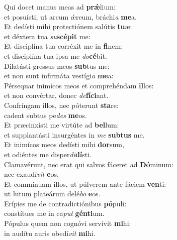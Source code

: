\oddverse Qui docet manus meas ad \textbf{prǽ}lium:~\*\\
\oddverse et posuísti, ut arcum ǽreum, bráchi\textit{a} \textbf{me}a.\\
\evenverse Et dedísti mihi protectiónem salútis \textbf{tu}æ:~\*\\
\evenverse et déxtera tua \textit{su}\textbf{scé}\textbf{pit} me:\\
\oddverse Et disciplína tua corréxit me in \textbf{fi}nem:~\*\\
\oddverse et disciplína tua ipsa me \textit{do}\textbf{cé}bit.\\
\evenverse Dilatásti gressus meos \textbf{sub}tus me:~\*\\
\evenverse et non sunt infirmáta vestígi\textit{a} \textbf{me}a:\\
\oddverse Pérsequar inimícos meos et comprehéndam \textbf{il}los:~\*\\
\oddverse et non convértar, donec \textit{de}\textbf{fí}\textbf{ci}ant.\\
\evenverse Confríngam illos, nec póterunt \textbf{sta}re:~\*\\
\evenverse cadent subtus pe\textit{des} \textbf{me}os.\\
\oddverse Et præcinxísti me virtúte ad \textbf{bel}lum:~\*\\
\oddverse et supplantásti insurgéntes in \textit{me} \textbf{sub}\textbf{tus} me.\\
\evenverse Et inimícos meos dedísti mihi \textbf{dor}sum,~\*\\
\evenverse et odiéntes me disper\textit{di}\textbf{dí}sti.\\
\oddverse Clamavérunt, nec erat qui salvos fáceret ad \textbf{Dó}minum:~\*\\
\oddverse nec exaudí\textit{vit} \textbf{e}os.\\
\evenverse Et commínuam illos, ut púlverem ante fáciem \textbf{ven}ti:~\*\\
\evenverse ut lutum plateárum delé\textit{bo} \textbf{e}os.\\
\oddverse Erípies me de contradictiónibus \textbf{pó}puli:~\*\\
\oddverse constítues me in ca\textit{put} \textbf{gén}\textbf{ti}um.\\
\evenverse Pópulus quem non cognóvi servívit \textbf{mi}hi:~\*\\
\evenverse in audítu auris obedí\textit{vit} \textbf{mi}hi.\\

